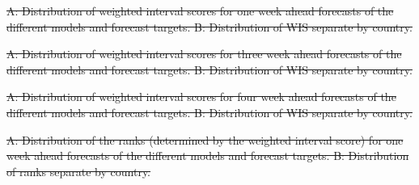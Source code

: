 \documentclass[10pt,letterpaper]{article}
\providecommand{\DIFdeltex}[1]{{\protect\color{red}\sout{#1}}}                      %
\providecommand{\DIFdelFL}[1]{\DIFdel{#1}} %
\providecommand{\DIFdel}[1]{\texorpdfstring{\DIFdeltex{#1}}{}} %
\begin{document}

{%
\DIFdelFL{A: Distribution of weighted interval scores for one week ahead forecasts of the different models and forecast targets. B: Distribution of WIS separate by country.}}%

{%
\DIFdelFL{A: Distribution of weighted interval scores for three week ahead forecasts of the different models and forecast targets. B: Distribution of WIS separate by country.}}%

{%
\DIFdelFL{A: Distribution of weighted interval scores for four week ahead forecasts of the different models and forecast targets. B: Distribution of WIS separate by country.}}%


{%
\DIFdelFL{A: Distribution of the ranks (determined by the weighted interval score) for one week ahead forecasts of the different models and forecast targets. B: Distribution of ranks separate by country.}}%
\end{document}
